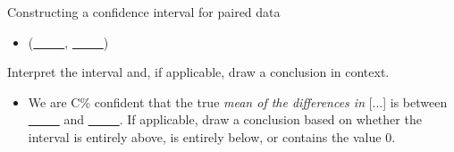 \begin{onebox}{Constructing a confidence interval for paired data}
\begin{itemize}
\begin{itemize}
\item[] $SE$ of estimate:  $\frac{s_{\text{\emph{diff}}}}{\sqrt{n_{_\text{\emph{diff}}}}}$
\item[] $t^{\star}$: use a $t$-table at row $df = n_{_\text{\emph{diff}}} - 1$ and confidence level C\%
\end{itemize}
\item[] (\underline{\ \ \ \ \ }, \underline{\ \ \ \ \ })
\end{itemize}
 Interpret the interval and, if applicable, draw a conclusion in context.\vspace{-1mm}
\begin{itemize}
\item[] We are C\%  confident that the true \emph{mean of the differences in} [...] is between \underline{\ \ \ \ \ } and  \underline{\ \ \ \ \ }. If applicable, draw a conclusion based on whether the interval is entirely above, is entirely below, or contains the value 0. 
\end{itemize}\end{onebox}

